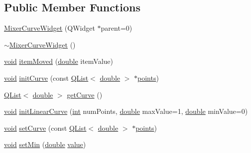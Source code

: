 \subsection*{Public Member Functions}
\begin{DoxyCompactItemize}
\item 
\hyperlink{group___u_a_v_object_widget_utils_gafcc28d34cf4bf00ed61926b4cbdd5a7e}{Mixer\-Curve\-Widget} (Q\-Widget $\ast$parent=0)
\item 
\hyperlink{group___u_a_v_object_widget_utils_ga95ab335915408821a081b9be9b837866}{$\sim$\-Mixer\-Curve\-Widget} ()
\item 
\hyperlink{group___u_a_v_objects_plugin_ga444cf2ff3f0ecbe028adce838d373f5c}{void} \hyperlink{group___u_a_v_object_widget_utils_ga1a7a9e06137eef080091ca11b1bf0c05}{item\-Moved} (\hyperlink{_super_l_u_support_8h_a8956b2b9f49bf918deed98379d159ca7}{double} item\-Value)
\item 
\hyperlink{group___u_a_v_objects_plugin_ga444cf2ff3f0ecbe028adce838d373f5c}{void} \hyperlink{group___u_a_v_object_widget_utils_gaa776ac520f82de83862c18af0ff99ce3}{init\-Curve} (const \hyperlink{class_q_list}{Q\-List}$<$ \hyperlink{_super_l_u_support_8h_a8956b2b9f49bf918deed98379d159ca7}{double} $>$ $\ast$\hyperlink{glext_8h_ae75d9f560170dfeaadc8718c87f5fbec}{points})
\item 
\hyperlink{class_q_list}{Q\-List}$<$ \hyperlink{_super_l_u_support_8h_a8956b2b9f49bf918deed98379d159ca7}{double} $>$ \hyperlink{group___u_a_v_object_widget_utils_gad97c9f7b189fc9097da50ab5b8f08f4d}{get\-Curve} ()
\item 
\hyperlink{group___u_a_v_objects_plugin_ga444cf2ff3f0ecbe028adce838d373f5c}{void} \hyperlink{group___u_a_v_object_widget_utils_gad0a76288e7cbdf09fb112176d236dfde}{init\-Linear\-Curve} (\hyperlink{ioapi_8h_a787fa3cf048117ba7123753c1e74fcd6}{int} num\-Points, \hyperlink{_super_l_u_support_8h_a8956b2b9f49bf918deed98379d159ca7}{double} max\-Value=1, \hyperlink{_super_l_u_support_8h_a8956b2b9f49bf918deed98379d159ca7}{double} min\-Value=0)
\item 
\hyperlink{group___u_a_v_objects_plugin_ga444cf2ff3f0ecbe028adce838d373f5c}{void} \hyperlink{group___u_a_v_object_widget_utils_ga0738fd8e0cf67713c6553da77c284a71}{set\-Curve} (const \hyperlink{class_q_list}{Q\-List}$<$ \hyperlink{_super_l_u_support_8h_a8956b2b9f49bf918deed98379d159ca7}{double} $>$ $\ast$\hyperlink{glext_8h_ae75d9f560170dfeaadc8718c87f5fbec}{points})
\item 
\hyperlink{group___u_a_v_objects_plugin_ga444cf2ff3f0ecbe028adce838d373f5c}{void} \hyperlink{group___u_a_v_object_widget_utils_ga78338911bd3605c13be6672b2a94d346}{set\-Min} (\hyperlink{_super_l_u_support_8h_a8956b2b9f49bf918deed98379d159ca7}{double} \hyperlink{glext_8h_aa0e2e9cea7f208d28acda0480144beb0}{value})

\end{DoxyCompactItemize}
